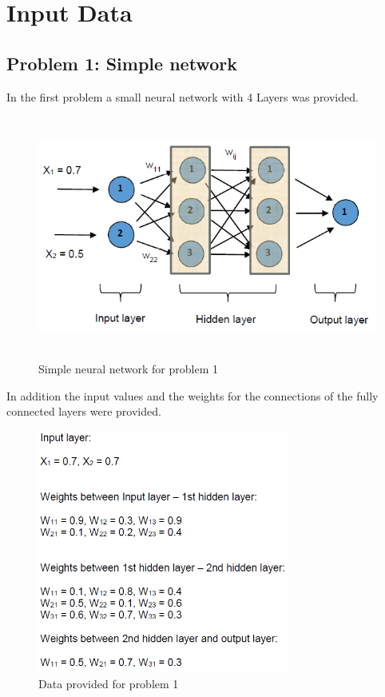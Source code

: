 \chapter{Input Data}
\section{Problem 1: Simple network}
In the first problem a small neural network with 4 Layers was provided.
\begin{figure}[h]
	\centering
	\includegraphics[height=8cm]{img/nn_task1.png}
	\caption{Simple neural network for problem 1}
    \label{nn_task1}
\end{figure}
In addition the input values and the weights for the connections of the fully connected layers were provided.
\begin{figure}[h]
	\centering
	\includegraphics[height=8cm]{img/data_task1.png}
	\caption{Data provided for problem 1}
    \label{data_task1}
\end{figure}
